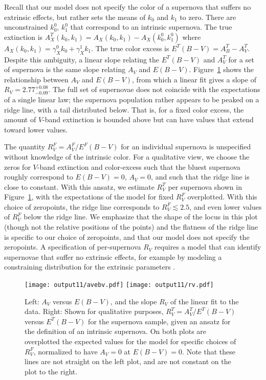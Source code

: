 \documentclass{aastex61}   	%
\begin{document}
\color{red}
Recall that our model does not specify the color of a supernova that suffers no extrinsic effects, but rather sets the
means of $k_0$ and $k_1$ to zero.
There are unconstrained $k_0^0$, $k_1^0$ that correspond to an intrinsic supernova.  The true extinction is
$A^T_X(k_0,k_1)= A_X(k_0,k_1) -  A_X(k^0_0,k^0_1)$ where $A_X(k_0,k_1) =  \gamma^0_X k_0 + \gamma^1_X k_1$.
The true color excess is $E^T(B-V) = A^T_B-A^T_V$.
Despite this ambiguity, a linear slope relating the $E^T(B-V)$ and $A^T_V$ for a set of supernova is the same slope
relating $A_V$ and $E(B-V)$.
\color{black}
Figure~\ref{avebv:fig} shows the relationship between $A_V$ and $E(B-V)$, from
which a linear fit gives a slope of $R_V=2.77^{+0.08}_{-0.09}$.
\color{red}
The full set of supernovae does not coincide with the expectations of a single linear law; the supernova population rather appears to be peaked
on a ridge line, with a tail distributed below.  That is, for a fixed color excess, the amount of $V$-band extinction is bounded above
but can have values that extend toward lower values.

The quantity $R^F_V = A^F_V/E^F(B-V)$ for an individual supernova is unspecified without knowledge of the intrinsic color.
For a qualitative view, we choose the zeros for $V$-band extinction and color-excess such that the bluest supernova roughly correspond to $E(B-V)=0$,
$A_V=0$, and such that the ridge line is close to constant.
With this ansatz, we
estimate $R^T_V$ per supernova shown in Figure~\ref{avebv:fig}, with the expectations of the
  model for fixed $R^F_V$ overplotted.
With this choice of zeropoints, the ridge line corresponds to $R_V^F\lesssim 2.5$, and even lower values of $R_V^F$ below the ridge line.
We emphasize that the shape of the locus in this plot (though not the relative positions of the points)  and the flatness
of the ridge line is specific to our choice of zeropoints, and that our model does not specify the zeropoints.
A specification of per-supernova $R_V$ requires a model that can identify supernovae that suffer no extrinsic effects,
for example by modeling  a constraining distribution for the extrinsic parameters \citep{2016arXiv160904470M}.
\color{black}

\begin{figure}[htbp] %
   \centering
   \texttt{[image: output11/avebv.pdf]}
   \texttt{[image: output11/rv.pdf]}
   \caption{
	\color{red}
   Left: $A_V$ versus $E(B-V)$, and the slope $R_V$ of the linear fit to the data. Right: Shown for qualitative purposes,
   $R^T_V=A^T_V/E^T(B-V)$ 
   versus $E^T(B-V)$ for the supernova sample, given an ansatz for the definition of an intrinsic supernova. 
   On both plots are overplotted the expected values for the  model
   for specific choices of $R^F_V$, normalized to have $A_V=0$ at $E(B-V)=0$.  Note that these lines are not straight on the left plot, and are not constant on the plot to the right.
   \color{black}
   \label{avebv:fig}}
\end{figure}
\end{document}
